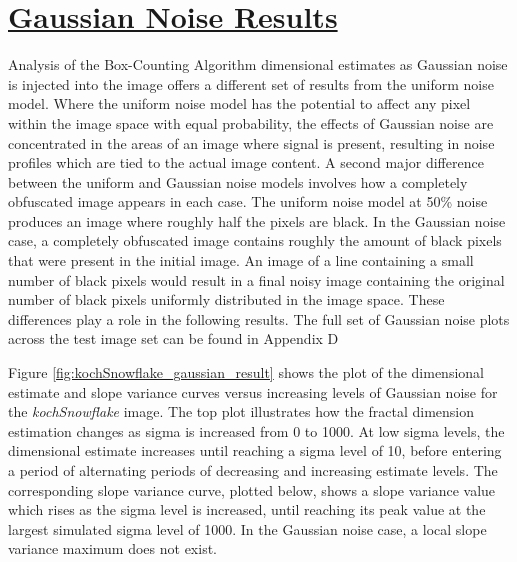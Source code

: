 \documentclass[12pt, oneside]{book}
\begin{document}
% 
%
\section{\underline{Gaussian Noise Results}}
Analysis of the Box-Counting Algorithm dimensional estimates as Gaussian noise is injected into the image offers a different set of results from the uniform noise model.  Where the uniform noise model has the potential to affect any pixel within the image space with equal probability, the effects of Gaussian noise are concentrated in the areas of an image where signal is present, resulting in noise profiles which are tied to the actual image content.  A second major difference between the uniform and Gaussian noise models involves how a completely obfuscated image appears in each case.  The uniform noise model at 50\% noise produces an image where roughly half the pixels are black.  In the Gaussian noise case, a completely obfuscated image contains roughly the amount of black pixels that were present in the initial image.  An image of a line containing a small number of black pixels would result in a final noisy image containing the original number of black pixels uniformly distributed in the image space.  These differences play a role in the following results.  The full set of Gaussian noise plots across the test image set can be found in Appendix D

Figure \ref{fig:kochSnowflake_gaussian_result} shows the plot of the dimensional estimate and slope variance curves versus increasing levels of Gaussian noise for the \textit{kochSnowflake} image.  The top plot illustrates how the fractal dimension estimation changes as sigma is increased from 0 to 1000.  At low sigma levels, the dimensional estimate increases until reaching a sigma level of 10, before entering a period of alternating periods of decreasing and increasing estimate levels.  The corresponding slope variance curve, plotted below, shows a slope variance value which rises as the sigma level is increased, until reaching its peak value at the largest simulated sigma level of 1000.  In the Gaussian noise case, a local slope variance maximum does not exist.  
\end{document}
